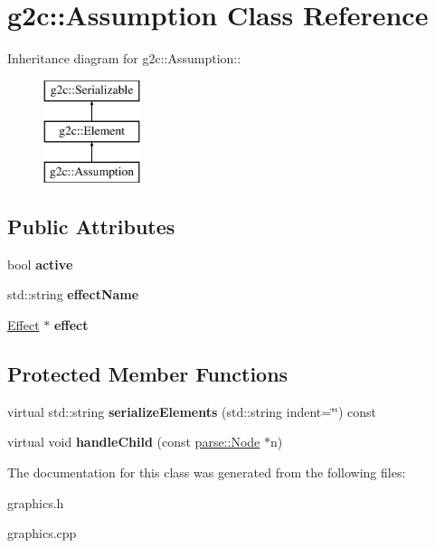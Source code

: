 \hypertarget{classg2c_1_1_assumption}{
\section{g2c::Assumption Class Reference}
\label{classg2c_1_1_assumption}
}
Inheritance diagram for g2c::Assumption::\begin{figure}[H]
\begin{center}
\leavevmode
\includegraphics[height=3cm]{classg2c_1_1_assumption}
\end{center}
\end{figure}
\subsection*{Public Attributes}
\begin{DoxyCompactItemize}
\item 
\hypertarget{classg2c_1_1_assumption_aa5a89539db4258107c2fcbdc95b4ee74}{
bool {\bfseries active}}
\label{classg2c_1_1_assumption_aa5a89539db4258107c2fcbdc95b4ee74}

\item 
\hypertarget{classg2c_1_1_assumption_af09ecb4b149746a72cf7ab6917a6dcb0}{
std::string {\bfseries effectName}}
\label{classg2c_1_1_assumption_af09ecb4b149746a72cf7ab6917a6dcb0}

\item 
\hypertarget{classg2c_1_1_assumption_a951a0f8034a0f357b8d17ccd1344257b}{
\hyperlink{classg2c_1_1_effect}{Effect} $\ast$ {\bfseries effect}}
\label{classg2c_1_1_assumption_a951a0f8034a0f357b8d17ccd1344257b}

\end{DoxyCompactItemize}
\subsection*{Protected Member Functions}
\begin{DoxyCompactItemize}
\item 
\hypertarget{classg2c_1_1_assumption_ab001d47d3cfc825406359d282c538b66}{
virtual std::string {\bfseries serializeElements} (std::string indent=\char`\"{}\char`\"{}) const }
\label{classg2c_1_1_assumption_ab001d47d3cfc825406359d282c538b66}

\item 
\hypertarget{classg2c_1_1_assumption_af4c6aca5672389c5b95093b469e9f89c}{
virtual void {\bfseries handleChild} (const \hyperlink{classparse_1_1_node}{parse::Node} $\ast$n)}
\label{classg2c_1_1_assumption_af4c6aca5672389c5b95093b469e9f89c}

\end{DoxyCompactItemize}


The documentation for this class was generated from the following files:\begin{DoxyCompactItemize}
\item 
graphics.h\item 
graphics.cpp\end{DoxyCompactItemize}
